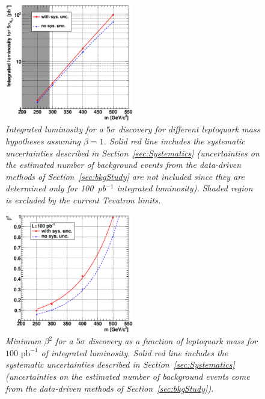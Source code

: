 \begin{figure}[h!]
 \centering
  \includegraphics[width=0.5\textwidth]{plots/cmsPotential/L5sigma_vs_m_log.eps}
 \caption{\small \sl Integrated luminosity for a $5\sigma$ discovery for different leptoquark mass hypotheses assuming $\beta=1$. 
Solid red line includes the systematic uncertainties described in Section~\ref{sec:Systematics} 
(uncertainties on the estimated number of background events from the data-driven methods
of Section~\ref{sec:bkgStudy} are not included since they are determined only for 100~pb$^{-1}$ integrated luminosity). 
Shaded region is excluded by the current Tevatron limits.\label{fig:discovery}}
\end{figure}
\begin{figure}[h!]
 \centering
  \includegraphics[width=0.5\textwidth]{plots/cmsPotential/beta2_vs_m.eps}
 \caption{\small \sl Minimum $\beta^2$ for
a $5\sigma$ discovery as a function of leptoquark mass for $100\text{ pb}^{-1}$ of integrated luminosity. Solid red line includes the systematic
uncertainties described in Section~\ref{sec:Systematics} 
(uncertainties on the estimated number of background events come from the data-driven methods of Section~\ref{sec:bkgStudy}).
\label{fig:discovery_beta}}
\end{figure}


